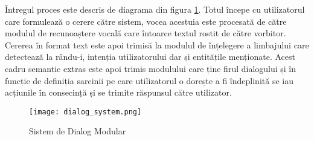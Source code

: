 Întregul proces este descris de diagrama din figura \ref{fig:ds_proc}. Totul începe cu utilizatorul care formulează o cerere către sistem, vocea acestuia este procesată de către modulul de recunoaștere vocală care întoarce textul rostit de către vorbitor. Cererea în format text este apoi trimisă la modulul de înțelegere a limbajului care detectează la rându-i, intenția utilizatorului dar și entitățile menționate. Acest cadru semantic extras este apoi trimis modulului care ține firul dialogului și în funcție de definiția sarcinii pe care utilizatorul o dorește a fi îndeplinită se iau acțiunile în consecință și se trimite răspunsul către utilizator.

\begin{figure}[h]
	\centering
	\texttt{[image: dialog\_system.png]}
	\caption{Sistem de Dialog Modular}
	\label{fig:ds_proc}
\end{figure}